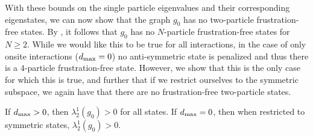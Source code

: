 \documentclass[../thesis-main/thesis-main]{subfiles}
\begin{document}
With these bounds on the single particle eigenvalues and their corresponding eigenstates, we can now show that the graph $g_{0}$ has no two-particle frustration-free states. By , it follows that $g_0$ has no $N$-particle frustration-free states for $N\geq 2$.  While we would like this to be true for all interactions, in the case of only onsite interactions ($d_{\text{max}} =0$) no anti-symmetric state is penalized and thus there is a $4$-particle frustration-free state.  However, we show that this is the only case for which this is true, and further that if we restrict ourselves to the symmetric subspace, we again have that there are no frustration-free two-particle states.

\begin{lemma}
\label{lem:2particle}If $d_{\text{max}} > 0$, then $\lambda_{2}^{1}(g_{0})>0$ for all states.  If $d_{\text{max}} = 0$, then when restricted to symmetric states, $\lambda_2^{1}(g_0) >0$.
\end{lemma}
\end{document}
